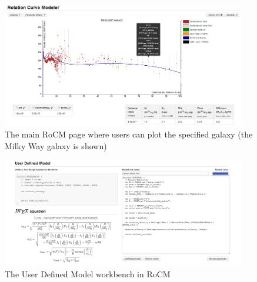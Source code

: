 \documentclass[conference]{IEEEtran}
\begin{document}
\begin{figure}[h!]
\centering
\includegraphics[width=0.95\textwidth, frame,trim = -1cm -1cm -1cm -1cm, clip]{rocm_screenshot2}
\caption{The main RoCM page where users can plot the specified galaxy (the Milky Way galaxy is shown)}
\label{rocm_fig}
\end{figure}


\begin{figure}[h!]
\centering
\includegraphics[width=0.95\textwidth, frame]{udm2}
\caption{The User Defined Model workbench in RoCM}
\label{udm}
\end{figure}
\end{document}
